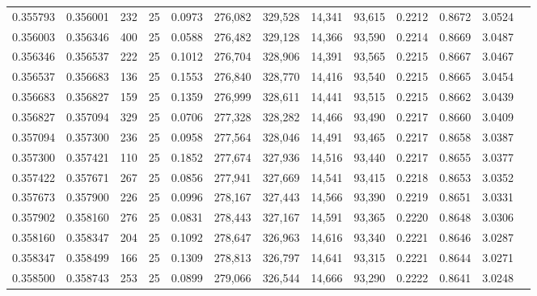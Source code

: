 \begin{tabular}{rrrrrrrrrrrrr}
0.355793 & 0.356001 &   232 &  25 &                                     0.0973 & 276,082 & 329,528 &  14,341 &  93,615 & 0.2212 & 0.8672 & 3.0524 \\
0.356003 & 0.356346 &   400 &  25 &                                     0.0588 & 276,482 & 329,128 &  14,366 &  93,590 & 0.2214 & 0.8669 & 3.0487 \\
0.356346 & 0.356537 &   222 &  25 &                                     0.1012 & 276,704 & 328,906 &  14,391 &  93,565 & 0.2215 & 0.8667 & 3.0467 \\
0.356537 & 0.356683 &   136 &  25 &                                     0.1553 & 276,840 & 328,770 &  14,416 &  93,540 & 0.2215 & 0.8665 & 3.0454 \\
0.356683 & 0.356827 &   159 &  25 &                                     0.1359 & 276,999 & 328,611 &  14,441 &  93,515 & 0.2215 & 0.8662 & 3.0439 \\
0.356827 & 0.357094 &   329 &  25 &                                     0.0706 & 277,328 & 328,282 &  14,466 &  93,490 & 0.2217 & 0.8660 & 3.0409 \\
0.357094 & 0.357300 &   236 &  25 &                                     0.0958 & 277,564 & 328,046 &  14,491 &  93,465 & 0.2217 & 0.8658 & 3.0387 \\
0.357300 & 0.357421 &   110 &  25 &                                     0.1852 & 277,674 & 327,936 &  14,516 &  93,440 & 0.2217 & 0.8655 & 3.0377 \\
0.357422 & 0.357671 &   267 &  25 &                                     0.0856 & 277,941 & 327,669 &  14,541 &  93,415 & 0.2218 & 0.8653 & 3.0352 \\
0.357673 & 0.357900 &   226 &  25 &                                     0.0996 & 278,167 & 327,443 &  14,566 &  93,390 & 0.2219 & 0.8651 & 3.0331 \\
0.357902 & 0.358160 &   276 &  25 &                                     0.0831 & 278,443 & 327,167 &  14,591 &  93,365 & 0.2220 & 0.8648 & 3.0306 \\
0.358160 & 0.358347 &   204 &  25 &                                     0.1092 & 278,647 & 326,963 &  14,616 &  93,340 & 0.2221 & 0.8646 & 3.0287 \\
0.358347 & 0.358499 &   166 &  25 &                                     0.1309 & 278,813 & 326,797 &  14,641 &  93,315 & 0.2221 & 0.8644 & 3.0271 \\
0.358500 & 0.358743 &   253 &  25 &                                     0.0899 & 279,066 & 326,544 &  14,666 &  93,290 & 0.2222 & 0.8641 & 3.0248 \\

\end{tabular}
